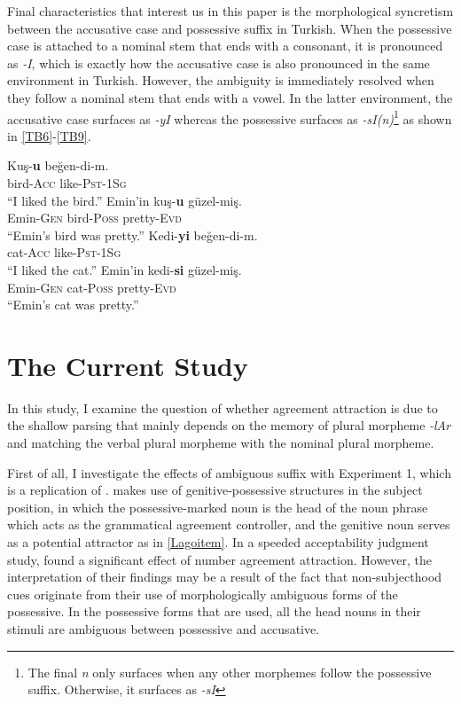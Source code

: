 \documentclass[doc]{apa6}
\let\rmarkdownfootnote\footnote%
\def\footnote{\protect\rmarkdownfootnote}
\begin{document}
Final characteristics that interest us in this paper is the morphological syncretism between the accusative case and possessive suffix in Turkish. When the possessive case is attached to a nominal stem that ends with a consonant, it is pronounced as \textit{-I}, which is exactly how the accusative case is also pronounced in the same environment in Turkish. However, the ambiguity is immediately resolved when they follow a nominal stem that ends with a vowel. In the latter environment, the accusative case surfaces as \emph{-yI} whereas the possessive surfaces as \emph{-sI(n)}\footnote{The final \textit{n} only surfaces when any other morphemes follow the possessive suffix. Otherwise, it surfaces as \textit{-sI}} as shown in \autoref{TB6}-\autoref{TB9}.

\begin{exe}
\ex
\begin{xlist}
\ex \label{TB6}
\gll Kuş-\textbf{u} beğen-di-m.\\
bird-\textsc{Acc} like-\textsc{Pst}-\textsc{1Sg}\\
\glt ``I liked the bird.''
\ex \label{TB7}
\gll Emin'in kuş-\textbf{u} güzel-miş.\\
Emin-\textsc{Gen} bird-\textsc{Poss} pretty-\textsc{Evd}\\
\glt ``Emin's bird was pretty.''
\ex \label{TB8}
\gll Kedi-\textbf{yi} beğen-di-m.\\
cat-\textsc{Acc} like-\textsc{Pst}-\textsc{1Sg}\\
\glt ``I liked the cat.''
\ex \label{TB9}
\gll Emin'in kedi-\textbf{si} güzel-miş.\\
Emin-\textsc{Gen} cat-\textsc{Poss} pretty-\textsc{Evd}\\
\glt ``Emin's cat was pretty.''
\end{xlist}
\end{exe}

\hypertarget{the-current-study}{%
\section{The Current Study}\label{the-current-study}}

In this study, I examine the question of whether agreement attraction is due to the shallow parsing that mainly depends on the memory of plural morpheme \emph{-lAr} and matching the verbal plural morpheme with the nominal plural morpheme.

First of all, I investigate the effects of ambiguous suffix with Experiment 1, which is a replication of \textcite{Lago2018}. \textcite{Lago2018} makes use of genitive-possessive structures in the subject position, in which the possessive-marked noun is the head of the noun phrase which acts as the grammatical agreement controller, and the genitive noun serves as a potential attractor as in \autoref{Lagoitem}. In a speeded acceptability judgment study, \textcite{Lago2018} found a significant effect of number agreement attraction. However, the interpretation of their findings may be a result of the fact that non-subjecthood cues originate from their use of morphologically ambiguous forms of the possessive. In the possessive forms that are used, all the head nouns in their stimuli are ambiguous between possessive and accusative.
\end{document}
